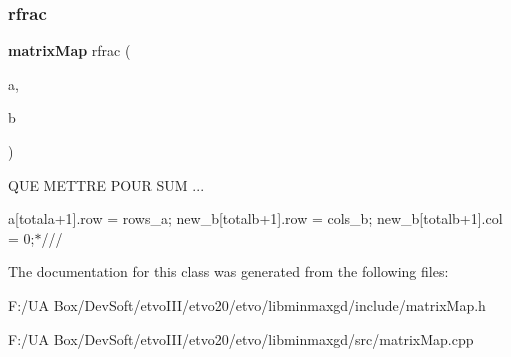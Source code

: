 \subsubsection{rfrac}
{\footnotesize\ttfamily \textbf{ matrix\+Map} rfrac (\begin{DoxyParamCaption}\item[{\textbf{ matrix\+Map} \&}]{a,  }\item[{\textbf{ matrix\+Map} \&}]{b }\end{DoxyParamCaption})\hspace{0.3cm}{\ttfamily [friend]}}

Q\+UE M\+E\+T\+T\+RE P\+O\+UR S\+UM ...


\begin{DoxyItemize}
\item a[totala+1].row = rows\+\_\+a; new\+\_\+b[totalb+1].row = cols\+\_\+b; new\+\_\+b[totalb+1].col = 0;$\ast$/// 
\end{DoxyItemize}

The documentation for this class was generated from the following files\+:\begin{DoxyCompactItemize}
\item 
F\+:/\+U\+A Box/\+Dev\+Soft/etvo\+I\+I\+I/etvo20/etvo/libminmaxgd/include/matrix\+Map.\+h\item 
F\+:/\+U\+A Box/\+Dev\+Soft/etvo\+I\+I\+I/etvo20/etvo/libminmaxgd/src/matrix\+Map.\+cpp\end{DoxyCompactItemize}
